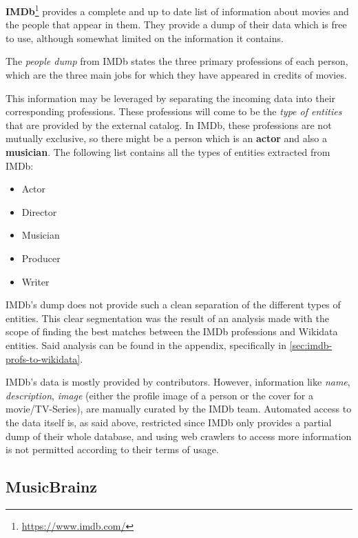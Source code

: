 \documentclass[epsfig,a4paper,11pt,titlepage,twoside,openany]{book}
\newcommand{\footurl}[1]{\footnote{\url{#1}}}
\begin{document}
\textbf{IMDb}\footurl{https://www.imdb.com/} provides a complete and up to date list of information about movies and the people that appear in them. They provide a dump of their data which is free to use, although somewhat limited on the information it contains.

The \textit{people dump} from IMDb states the three primary professions of each person, which are the three main jobs for which they have appeared in credits of movies. 


This information may be leveraged by separating the incoming data into their corresponding professions. These professions will come to be the \textit{type of entities} that are provided by the external catalog. In IMDb, these professions are not mutually exclusive, so there might be a person which is an \textbf{actor} and also a \textbf{musician}. The following list contains all the types of entities extracted from IMDb: 

\begin{itemize}
\item Actor
\item Director
\item Musician
\item Producer
\item Writer
\end{itemize}

IMDb’s dump does not provide such a clean separation of the different types of entities. This clear segmentation was the result of an analysis made with the scope of finding the best matches between the IMDb professions and Wikidata entities. Said analysis can be found in the appendix, specifically in \autoref{sec:imdb-profs-to-wikidata}. 

IMDb’s data is mostly provided by contributors. However, information like \textit{name}, \textit{description}, \textit{image} (either the profile image of a person or the cover for a movie/TV-Series), are manually curated by the IMDb team. Automated access to the data itself is, as said above, restricted since IMDb only provides a partial dump of their whole database, and using web crawlers to access more information is not permitted according to their terms of usage.



\subsection{MusicBrainz}
\label{sec:catalog-musicbrainz}
\end{document}
